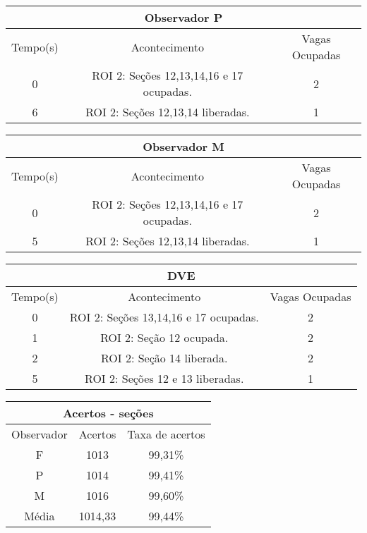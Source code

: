 \begin{center}
\begin{tabular}{|c||c||c|}
\hline
\multicolumn{3}{|c|}{Observador P}  \\ \hline \hline
Tempo(s) & Acontecimento & Vagas Ocupadas \\ \hline
0 & ROI 2: Seções 12,13,14,16 e 17 ocupadas. & 2 \\ \hline
6 & ROI 2: Seções 12,13,14 liberadas. & 1 \\ 
\hline
\end{tabular}
\end{center}

\begin{center}
\begin{tabular}{|c||c||c|}
\hline
\multicolumn{3}{|c|}{Observador M}  \\ \hline \hline
Tempo(s) & Acontecimento & Vagas Ocupadas \\ \hline
0 & ROI 2: Seções 12,13,14,16 e 17 ocupadas. & 2 \\ \hline
5 & ROI 2: Seções 12,13,14 liberadas. & 1 \\ 
\hline
\end{tabular}
\end{center}

\begin{center}
\begin{tabular}{|c||c||c|}
\hline
\multicolumn{3}{|c|}{DVE}  \\ \hline \hline
Tempo(s) & Acontecimento & Vagas Ocupadas \\ \hline
0 & ROI 2: Seções 13,14,16 e 17 ocupadas. & 2 \\ \hline
1 & ROI 2: Seção 12 ocupada. & 2 \\ \hline
2 & ROI 2: Seção 14 liberada. & 2 \\ \hline
5 & ROI 2: Seções 12 e 13 liberadas. & 1 \\
\hline
\end{tabular}
\end{center}

\begin{center}
\begin{tabular}{|c||c||c|}
\hline
\multicolumn{3}{|c|}{Acertos - seções}  \\ \hline
Observador & Acertos & Taxa de acertos \\ \hline
F & 1013 & 99,31\% \\  \hline
P & 1014 & 99,41\% \\ \hline
M & 1016 & 99,60\% \\ \hline
Média & 1014,33 & 99,44\% \\
\hline
\end{tabular}
\end{center}

